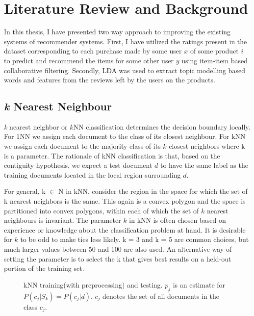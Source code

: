 \chapter{Literature Review and Background}
In this thesis, I have presented two way approach to improving the existing systems of recommender systems.
First, I have utilized the ratings present in the dataset corresponding to each purchase made by some user $x$ of some product $i$ to predict and recommend the items for some other user $y$ using item-item based collaborative filtering. Secondly, LDA was used to extract topic modelling based words and features from the reviews left by the users on the products.

\section{\textit{k} Nearest Neighbour}
\textit{k} nearest neighbor or $k$NN classification determines the decision boundary locally. For $1$NN we assign each document to the class of its closest neighbour. For kNN we assign each document to the majority class of its $k$ closest neighbors where k is a parameter. The rationale of kNN classification is that, based on the contiguity hypothesis, we expect a test document $d$ to have the same label as the training documents located in the local region surrounding $d$.

For general, k $\in$ N in kNN, consider the region in the space for which the set of k nearest neighbors is the same. This again is a convex polygon and the space is partitioned into convex polygons, within each of which the set of $k$ nearest neighbours is invariant.
The parameter $k$ in kNN is often chosen based on experience or knowledge about the classification problem at hand. It is desirable for $k$ to be odd to make ties less likely. k = 3 and k = 5 are common choices, but much larger values between 50 and 100 are also used.  An alternative way of setting the parameter is to select the k that gives best results on a held-out portion of the training set.
\begin{figure}[H]
    {\par}
    \caption{kNN  training(with preprocessing) and testing. $p_{j}$ is an estimate for $P(c_{j}|S_{k}) = P(c_{j}|d)$. $c_{j}$ denotes the set of all documents in the class $c_{j}$.}
\end{figure}

